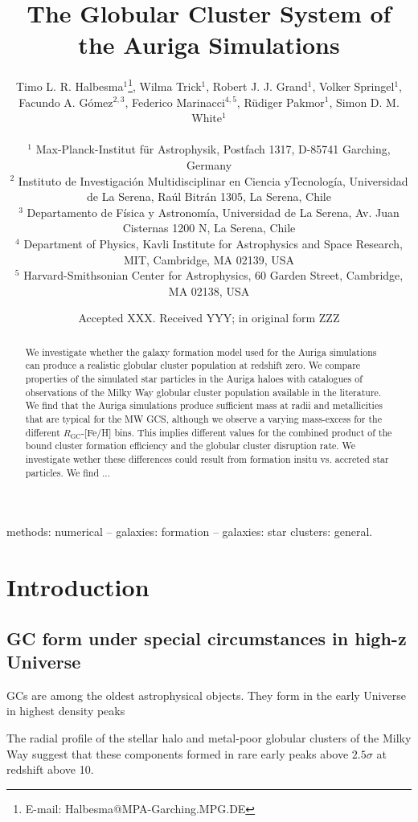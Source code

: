 \documentclass[a4paper,fleqn,usenatbib]{mnras}
\title[Auriga GCS]{The Globular Cluster System of the Auriga Simulations}
\author[T. L. R. Halbesma et al.]{\parbox[t]{\textwidth}{
    Timo L. R. Halbesma$^{1}$\thanks{E-mail: Halbesma@MPA-Garching.MPG.DE},
    Wilma Trick$^{1}$,
    Robert J. J. Grand$^{1}$, 
    Volker Springel$^{1}$, 
    Facundo A. G\'{o}mez$^{2,3}$, 
    Federico Marinacci$^{4,5}$,
    R\"{u}diger Pakmor$^{1}$, 
    Simon D. M. White$^{1}$
} \vspace{10pt} \\
$^{1}$ Max-Planck-Institut f\"ur Astrophysik, Postfach 1317, D-85741 Garching, Germany \\
$^{2}$ Instituto de Investigaci\'{o}n Multidisciplinar en Ciencia yTecnolog\'{i}a, Universidad de La Serena, Ra\'{u}l Bitr\'{a}n 1305, La Serena, Chile \\
$^{3}$ Departamento de F\'{i}sica y Astronom\'{i}a, Universidad de La Serena, Av. Juan Cisternas 1200 N, La Serena, Chile \\
$^{4}$ Department of Physics, Kavli Institute for Astrophysics and Space Research, MIT, Cambridge, MA 02139, USA \\
$^{5}$ Harvard-Smithsonian Center for Astrophysics, 60 Garden Street, Cambridge, MA 02138, USA \\
}
\date{Accepted XXX. Received YYY; in original form ZZZ}
\begin{document}
\label{firstpage}
\pagerange{\pageref{firstpage}--\pageref{lastpage}}
\maketitle

\begin{abstract}
We investigate whether the galaxy formation model used for the Auriga simulations 
can produce a realistic globular cluster population at redshift zero. We compare
properties of the simulated star particles in the Auriga haloes with
catalogues of observations of the Milky Way globular cluster population available
in the literature. We find that the Auriga simulations produce sufficient mass
at radii and metallicities that are typical for the MW GCS, although we observe
a varying mass-excess for the different $R_{\text{GC}}$-[Fe/H] bins. This implies
different values for the combined product of the bound cluster formation efficiency
and the globular cluster disruption rate. We investigate wether these differences
could result from formation insitu vs. accreted star particles. We find ...
\end{abstract}

\begin{keywords}
methods: numerical -- galaxies: formation -- galaxies: star clusters: general.
\end{keywords}



\section{Introduction}

\subsection{GC form under special circumstances in high-z Universe}
\begin{zitat}{\citet{2017MNRAS.465.3622R}}
GCs are among the oldest astrophysical objects. They form in the early Universe in
highest density peaks \citep[e.g.][]{2005MNRAS.364..367D, 2009ApJ...706L.192B}
\end{zitat}

\begin{zitat}{\citet{2005MNRAS.364..367D}}
The radial profile of the stellar halo and metal-poor globular
clusters of the Milky Way suggest that these components formed in rare
early peaks above $2.5 \sigma$ at redshift above 10.
\end{zitat}
\end{document}
